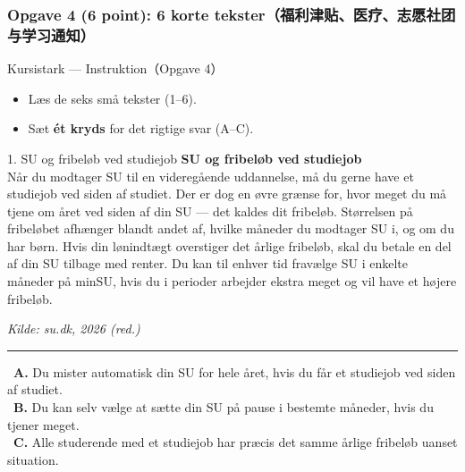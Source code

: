 \subsubsection*{Opgave 4 (6 point): 6 korte tekster（福利津贴、医疗、志愿社团与学习通知）}

\begin{emailbox}{Kursistark --- Instruktion（Opgave 4）}
\begin{itemize}
  \item Læs de seks små tekster (1--6).
  \item Sæt \textbf{ét kryds} for det rigtige svar (A--C).
\end{itemize}
\end{emailbox}

\begin{emailbox}{1. SU og fribeløb ved studiejob}
\textbf{SU og fribeløb ved studiejob}\\
Når du modtager SU til en videregående uddannelse, må du gerne have et studiejob ved siden af studiet. Der er dog en øvre grænse for, hvor meget du må tjene om året ved siden af din SU --- det kaldes dit fribeløb. Størrelsen på fribeløbet afhænger blandt andet af, hvilke måneder du modtager SU i, og om du har børn. Hvis din lønindtægt overstiger det årlige fribeløb, skal du betale en del af din SU tilbage med renter. Du kan til enhver tid fravælge SU i enkelte måneder på minSU, hvis du i perioder arbejder ekstra meget og vil have et højere fribeløb.
\par\vspace{0.15em}\strut\hfill {\small\textit{Kilde: su.dk, 2026 (red.)}}

\vspace{0.3em}
\hrule
\vspace{0.3em}
\small
\fbox{\phantom{X}}\ \textbf{A.} Du mister automatisk din SU for hele året, hvis du får et studiejob ved siden af studiet.\\[0.25em]
\fbox{\phantom{X}}\ \textbf{B.} Du kan selv vælge at sætte din SU på pause i bestemte måneder, hvis du tjener meget.\\[0.25em]
\fbox{\phantom{X}}\ \textbf{C.} Alle studerende med et studiejob har præcis det samme årlige fribeløb uanset situation.
\end{emailbox}

